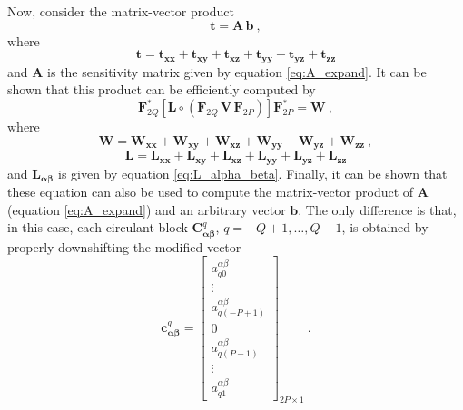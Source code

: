 Now, consider the matrix-vector product
\begin{equation}
\mathbf{t} = 
\mathbf{A} \, \mathbf{b} \: ,
\label{eq:t}
\end{equation}
where 
\begin{equation}
\mathbf{t} = \mathbf{t}_{\boldsymbol{xx}} + \mathbf{t}_{\boldsymbol{xy}} + \mathbf{t}_{\boldsymbol{xz}} +
\mathbf{t}_{\boldsymbol{yy}} + \mathbf{t}_{\boldsymbol{yz}} + \mathbf{t}_{\boldsymbol{zz}}
\label{eq:t-components}
\end{equation}
and $\mathbf{A}$ is the sensitivity matrix given by equation \ref{eq:A_expand}. It can be shown
that this product can be efficiently computed by
\begin{equation}
\mathbf{F}_{2Q}^{\ast} \left[ 
\mathbf{L} \circ \left(\mathbf{F}_{2Q} \, \mathbf{V} \, \mathbf{F}_{2P} \right) 
\right] \mathbf{F}_{2P}^{\ast} = \mathbf{W} \: ,
\label{eq:2d-discrete-convolution-complete}
\end{equation}
where
\begin{equation}
\mathbf{W} = \mathbf{W}_{\boldsymbol{xx}} + \mathbf{W}_{\boldsymbol{xy}} + \mathbf{W}_{\boldsymbol{xz}} + \mathbf{W}_{\boldsymbol{yy}} + \mathbf{W}_{\boldsymbol{yz}} + \mathbf{W}_{\boldsymbol{zz}} \: ,
\label{eq:W}
\end{equation}
\begin{equation}
\mathbf{L} = \mathbf{L}_{\boldsymbol{xx}} + \mathbf{L}_{\boldsymbol{xy}} + \mathbf{L}_{\boldsymbol{xz}} + \mathbf{L}_{\boldsymbol{yy}} + \mathbf{L}_{\boldsymbol{yz}} + \mathbf{L}_{\boldsymbol{zz}}
\label{eq:L}
\end{equation}
and $\mathbf{L}_{\boldsymbol{\alpha\beta}}$ is given by equation \ref{eq:L_alpha_beta}.
Finally, it can be shown that these equation can also be used to compute the 
matrix-vector product of $\mathbf{A}$ (equation \ref{eq:A_expand}) and an arbitrary vector 
$\mathbf{b}$. The only difference is that, in this case, each circulant block 
$\mathbf{C}_{\boldsymbol{\alpha\beta}}^{q}$, $q = -Q+1, \dots, Q-1$, is obtained by properly
downshifting the modified vector
\begin{equation}
\mathbf{c}_{\boldsymbol{\alpha\beta}}^{q} = \begin{bmatrix}
a^{\alpha\beta}_{q0} \\
\vdots \\
a^{\alpha\beta}_{q(-P+1)} \\
0 \\
a^{\alpha\beta}_{q(P-1)} \\
\vdots \\
a^{\alpha\beta}_{q1}
\end{bmatrix}_{2P \times 1} \: .
\label{eq:cq_alpha_beta_trnasposed}
\end{equation}


